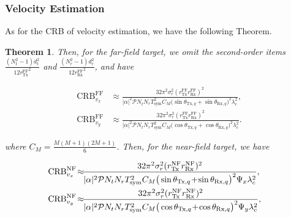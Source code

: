 \documentclass[9pt,final,journal,twocolumn]{IEEEtran}
\newtheorem{theorem}{Theorem}
\begin{document}
\subsubsection{Velocity Estimation}
As for the CRB of velocity estimation, we have the following Theorem.
%
\begin{theorem}
Then, for the far-field target, we omit the second-order items $\frac{(N_t^2-1)d_t^2}{12{r_{\mathrm{Tx}}^{\mathrm{FF}}}^2}$ and $\frac{(N_r^2-1)d_r^2}{12{r_{\mathrm{Rx}}^{\mathrm{FF}}}^2}$, and have
\begin{small}
\begin{subequations}
\label{CRB_vel_FF_final}
\begin{align}
\mathrm{CRB}_{v_x}^{\mathrm{FF}}
&\!\approx\!
\frac{32\pi^2\sigma_r^2(r_{\mathrm{Tx}}^{\mathrm{FF}}r_{\mathrm{Rx}}^{\mathrm{FF}})^2}
{|\alpha|^2\mathcal{P}N_tN_rT_{\mathrm{sym}}^2
C_M\big(\sin\theta_{\mathrm{Tx},q}\!+\!\sin\theta_{\mathrm{Rx},q}\big)^2\lambda_c^2}, \\
\mathrm{CRB}_{v_y}^{\mathrm{FF}} 
&\!\approx\!
\frac{32\pi^2\sigma_r^2(r_{\mathrm{Tx}}^{\mathrm{FF}}r_{\mathrm{Rx}}^{\mathrm{FF}})^2}
{|\alpha|^2\mathcal{P}N_tN_rT_{\mathrm{sym}}^2
C_M
\big(\cos\theta_{\mathrm{Tx},q}\!+\!\cos\theta_{\mathrm{Rx},q}\big)^2\lambda_c^2}.
\end{align}
\end{subequations}
\end{small}
\noindent\hspace{-0.8em} where $C_M=\frac{M(M+1)(2M+1)}{6}$.
Then, for the near-field target, we have 
\begin{small}
\begin{subequations}\label{CRB_vel_NF_final}
\begin{align}
\hspace*{-1em}\mathrm{CRB}_{v_x}^{\mathrm{NF}} 
\!\approx\!&
\frac{32\pi^2\sigma_r^2({r_{\mathrm{Tx}}^{\mathrm{NF}}}{r_{\mathrm{Rx}}^{\mathrm{NF}}})^2}
{|\alpha|^2\mathcal{P}N_tN_rT_{\mathrm{sym}}^2
C_M\big(\sin\theta_{\mathrm{Tx},q}\!+\!\sin\theta_{\mathrm{Rx},q}\big)^2
\Psi_{x}\lambda_c^2}, \\
\hspace*{-1em}\mathrm{CRB}_{v_y}^{\mathrm{NF}}
\!\approx\!&
\frac{32\pi^2\sigma_r^2({r_{\mathrm{Tx}}^{\mathrm{NF}}}{r_{\mathrm{Rx}}^{\mathrm{NF}}})^2}
{|\alpha|^2\mathcal{P}N_tN_rT_{\mathrm{sym}}^2
C_M
\big(\cos\theta_{\mathrm{Tx},q}\!+\!\cos\theta_{\mathrm{Rx},q}\big)^2
\Psi_{y}\lambda_c^2}, 
\end{align}
\end{subequations}

\end{small}
\end{theorem}
\end{document}
